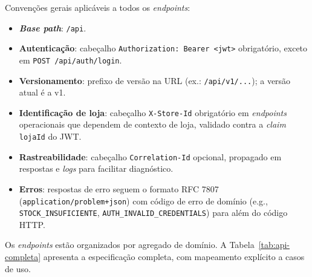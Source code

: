     Convenções gerais aplicáveis a todos os \textit{endpoints}:

\begin{itemize}
    \item \textbf{\textit{Base path}}: \texttt{/api}.
    \item \textbf{Autenticação}: cabeçalho \texttt{Authorization: Bearer <jwt>} obrigatório, exceto em \texttt{POST /api/auth/login}.
    \item \textbf{Versionamento}: prefixo de versão na URL (ex.: \texttt{/api/v1/...}); a versão atual é a v1.
    \item \textbf{Identificação de loja}: cabeçalho \texttt{X-Store-Id} obrigatório em \textit{endpoints} operacionais que dependem de contexto de loja, validado contra a \textit{claim} \texttt{lojaId} do JWT.
    \item \textbf{Rastreabilidade}: cabeçalho \texttt{Correlation-Id} opcional, propagado em respostas e \textit{logs} para facilitar diagnóstico.
    \item \textbf{Erros}: respostas de erro seguem o formato RFC 7807 (\texttt{application/problem+json}) com código de erro de domínio (e.g., \texttt{STOCK\_INSUFICIENTE}, \texttt{AUTH\_INVALID\_CREDENTIALS}) para além do código HTTP.
\end{itemize}

    Os \textit{endpoints} estão organizados por agregado de domínio. A Tabela~\ref{tab:api-completa} apresenta a especificação completa, com mapeamento explícito a casos de uso.

